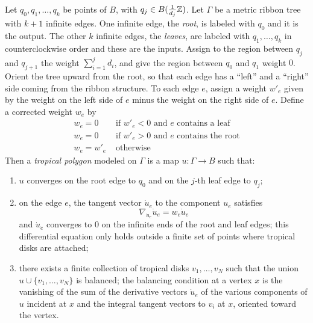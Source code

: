 \documentclass[12pt]{amsart}
\begin{document}
\begin{definition}
  \label{def:tropical-polygon}
  Let $q_0, q_1, \dots, q_k$ be points of $B$, with $q_j \in
  B(\frac{1}{d_j}\mathbb{Z})$. Let $\Gamma$ be a metric ribbon tree with $k+1$
  infinite edges. One infinite edge, the \emph{root}, is labeled with
  $q_0$ and it is the output. The other $k$ infinite edges, the
  \emph{leaves}, are labeled with $q_1,\dots,q_k$ in counterclockwise
  order and these are the inputs. Assign to the region between $q_j$
  and $q_{j+1}$ the weight $\sum_{i=1}^jd_i$, and give the region
  between $q_0$ and $q_1$ weight $0$. Orient the tree upward from the
  root, so that each edge has a ``left'' and a ``right'' side coming
  from the ribbon structure. To each edge $e$, assign a weight $w'_e$
  given by the weight on the left side of $e$ minus the weight on the
  right side of $e$. Define a corrected weight $w_e$ by
  \begin{equation}
    \begin{split}
      w_e = 0 & \text{ if $w'_e < 0$ and $e$ contains a leaf}\\
      w_e = 0 & \text{ if $w'_e > 0$ and $e$ contains the root}\\
      w_e = w'_e &\text{ otherwise}
    \end{split}
  \end{equation}
  Then a \emph{tropical polygon} modeled on $\Gamma$ is a map $u:
  \Gamma \to B$ such that:
  \begin{enumerate}
  \item $u$ converges on the root edge to $q_0$ and on the $j$-th leaf edge to $q_j$;
  \item on the edge $e$, the tangent vector $\dot{u}_e$ to the
    component $u_e$ satisfies
    \begin{equation}
      \nabla_{\dot{u}_e} \dot{u}_e = w_e \dot{u}_e
    \end{equation}
    and $\dot{u}_e$ converges to $0$ on the infinite ends of the root and leaf edges; this differential
    equation only holds outside a finite set of points where tropical
    disks are attached;
  \item there exists a finite collection of tropical disks
    $v_1,\dots,v_N$ such that the union $u \cup \{v_1,\dots,v_N\}$ is
    balanced; the balancing condition at a vertex $x$ is the vanishing
    of the sum of the derivative vectors $\dot{u}_e$ of the various
    components of $u$ incident at $x$ and the integral tangent vectors
    to $v_i$ at $x$, oriented toward the vertex.
  \end{enumerate}
\end{definition}
\end{document}
